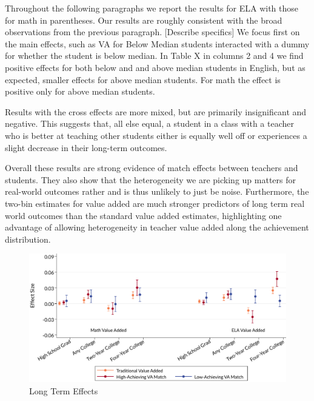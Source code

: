 \documentclass{article}
\theoremstyle{definition}
\theoremstyle{definition}
\theoremstyle{definition}
\theoremstyle{definition}
\begin{document}
Throughout the following paragraphs we report the results for ELA with those for math in parentheses. Our results are roughly consistent with the broad observations from the previous paragraph. 
 [Describe specifics]
We focus first on the main effects, such as VA for Below Median students interacted with a dummy for whether the student is below median. In Table X in columns 2 and 4 we find positive effects for both below and and above median students in English, but as expected, smaller effects for above median students. For math the effect is positive only for above median students.

Results with the cross effects are more mixed, but are primarily insignificant and negative. This suggests that, all else equal, a student in a class with a teacher who is better at teaching other students either is equally well off or experiences a slight decrease in their long-term outcomes.

Overall these results are strong evidence of match effects between teachers and students. They also show that the heterogeneity we are picking up matters for real-world outcomes rather and is thus unlikely to just be noise. Furthermore, the two-bin estimates for value added are much stronger predictors of long term real world outcomes than the standard value added estimates, highlighting one advantage of allowing heterogeneity in teacher value added along the achievement distribution.


\begin{figure}
\label{ong_term_ceofs}
\begin{center}


\includegraphics[width=.95\textwidth]{slides/slides_pffls/fig2b_longterm.pdf}
\end{center}
    \caption{Long Term Effects}
    \label{fig:my_label}
\end{figure}
\end{document}
